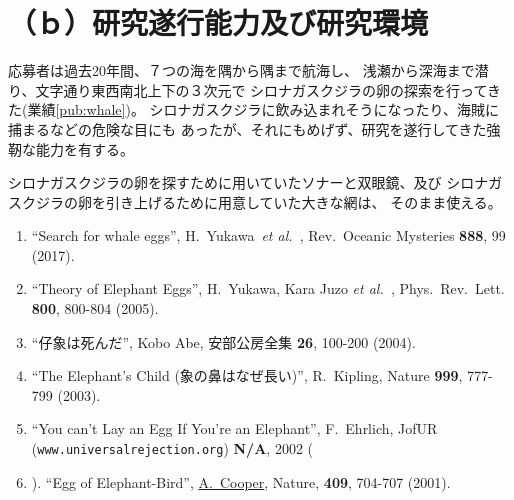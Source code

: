 \documentclass[11pt,a4j,dvipdfmx]{jarticle} 					%
\newcommand{\研究課題名}{象の卵}
\newcommand{\研究機関名}{逢坂大学}
\newcommand{\研究代表者氏名}{湯川秀樹}
\newcommand{\研究期間の最終元号年度}{9}  %
\newcommand{\paper}[6]{%
	\item ``#1'', #2, #3 {\bf #4}, #5 (#6).			%
}
\newcommand{\etal}{\textit{et al.\ }}
\newcommand{\yukawa}{H.~Yukawa}					%
\newcommand{\prl}{Phys.\ Rev.\ Lett.\ }		%
\begin{document}



\section{ （ｂ）研究遂行能力及び研究環境}

\PapersInstructions		%
	応募者は過去20年間、７つの海を隅から隅まで航海し、
	浅瀬から深海まで潜り、文字通り東西南北上下の３次元で
	シロナガスクジラの卵の探索を行ってきた(業績\ref{pub:whale})。
	シロナガスクジラに飲み込まれそうになったり、海賊に捕まるなどの危険な目にも
	あったが、それにもめげず、研究を遂行してきた強靭な能力を有する。

	シロナガスクジラの卵を探すために用いていたソナーと双眼鏡、及び
	シロナガスクジラの卵を引き上げるために用意していた大きな網は、
	そのまま使える。
	\begin{enumerate}
		\paper{Search for whale eggs}{\yukawa\ \etal}{Rev.\ Oceanic Mysteries}{888}{99}{2017}
			\label{pub:whale}
				
		\paper{Theory of Elephant Eggs}{\yukawa, Kara Juzo \etal}{\prl}{800}{800-804}{2005}
			\label{pub:theoegg}
				
		\paper{仔象は死んだ}{Kobo Abe}{安部公房全集}{26}{100-200}{2004}
		
		\paper{The Elephant's Child (象の鼻はなぜ長い)}{R.~Kipling}{Nature}{999}{777-799}{2003}

		\paper{You can't Lay an Egg If You're an Elephant}{F.~Ehrlich}
			{JofUR\\({\tt www.universalrejection.org})}{{\bf N/A}}{2002}
		
		\item ``Egg of Elephant-Bird'', 
				\underline{A.~Cooper},
				Nature, {\bf 409}, 704-707 (2001).	%
	\end{enumerate}


\end{document}
